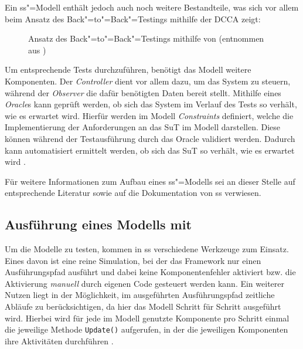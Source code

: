 Ein \gls{ss}"=Modell enthält jedoch auch noch weitere Bestandteile, was sich vor allem beim Ansatz des Back"=to"=Back"=Testings mithilfe der \gls{DCCA} zeigt:

\begin{figure}[h]
    \caption[Ansatz des Back"=to"=Back"=Testings mithilfe von ]
    {Ansatz des Back"=to"=Back"=Testings mithilfe von  (entnommen aus \cite{Eberhardinger2016})}
    \label{fig:ssharpB2BTesting}
\end{figure}

Um entsprechende Tests durchzuführen, benötigt das Modell weitere Komponenten.
Der \emph{Controller} dient vor allem dazu, um das System zu steuern, während der \emph{Observer} die dafür benötigten Daten bereit stellt.
Mithilfe eines \emph{Oracle}s kann geprüft werden, ob sich das System im Verlauf des Tests so verhält, wie es erwartet wird.
Hierfür werden im Modell \emph{Constraints} definiert, welche die Implementierung der Anforderungen an das \gls{SuT} im Modell darstellen.
Diese können während der Testausführung durch das Oracle validiert werden.
Dadurch kann automatisiert ermittelt werden, ob sich das \gls{SuT} so verhält, wie es erwartet wird \cite{Eberhardinger2016,Habermaier2015}.

Für weitere Informationen zum Aufbau eines \gls{ss}"=Modells sei an dieser Stelle auf entsprechende Literatur \cite{Eberhardinger2016,Habermaier2015,Habermaier2016} sowie auf die Dokumentation von \gls{ss} \cite{SSWiki} verwiesen.

\subsection{Ausführung eines Modells mit }
\label{subsec:ssharpExecution}

Um die Modelle zu testen, kommen in \gls{ss} verschiedene Werkzeuge zum Einsatz.
Eines davon ist eine reine Simulation, bei der das Framework nur einen Ausführungspfad ausführt und dabei keine Komponentenfehler aktiviert bzw. die Aktivierung \textit{manuell} durch eigenen Code gesteuert werden kann.
Ein weiterer Nutzen liegt in der Möglichkeit, im ausgeführten Ausführungspfad zeitliche Abläufe zu berücksichtigen, da hier das Modell Schritt für Schritt ausgeführt wird.
Hierbei wird für jede im Modell genutzte Komponente pro Schritt einmal die jeweilige Methode \texttt{Update()} aufgerufen, in der die jeweiligen Komponenten ihre Aktivitäten durchführen \cite{Habermaier2016}.

